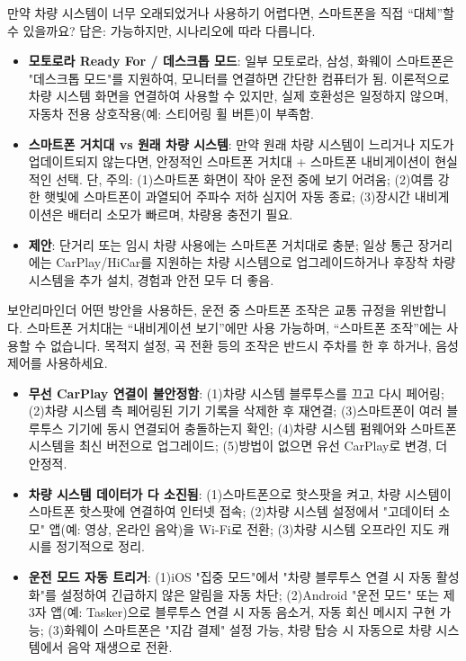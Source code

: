 
만약 차량 시스템이 너무 오래되었거나 사용하기 어렵다면, 스마트폰을 직접 “대체”할 수 있을까요? 답은: 가능하지만, 시나리오에 따라 다릅니다.

\begin{itemize}
  \item \textbf{모토로라 Ready For / 데스크톱 모드}: 일부 모토로라, 삼성, 화웨이 스마트폰은 "데스크톱 모드"를 지원하여, 모니터를 연결하면 간단한 컴퓨터가 됨. 이론적으로 차량 시스템 화면을 연결하여 사용할 수 있지만, 실제 호환성은 일정하지 않으며, 자동차 전용 상호작용(예: 스티어링 휠 버튼)이 부족함.
  \item \textbf{스마트폰 거치대 vs 원래 차량 시스템}: 만약 원래 차량 시스템이 느리거나 지도가 업데이트되지 않는다면, 안정적인 스마트폰 거치대 + 스마트폰 내비게이션이 현실적인 선택. 단, 주의: (1)스마트폰 화면이 작아 운전 중에 보기 어려움; (2)여름 강한 햇빛에 스마트폰이 과열되어 주파수 저하 심지어 자동 종료; (3)장시간 내비게이션은 배터리 소모가 빠르며, 차량용 충전기 필요.
  \item \textbf{제안}: 단거리 또는 임시 차량 사용에는 스마트폰 거치대로 충분; 일상 통근 장거리에는 CarPlay/HiCar를 지원하는 차량 시스템으로 업그레이드하거나 후장착 차량 시스템을 추가 설치, 경험과 안전 모두 더 좋음.
\end{itemize}

\begin{tcbwarn}{보안리마인더}
어떤 방안을 사용하든, 운전 중 스마트폰 조작은 교통 규정을 위반합니다. 스마트폰 거치대는 “내비게이션 보기”에만 사용 가능하며, “스마트폰 조작”에는 사용할 수 없습니다. 목적지 설정, 곡 전환 등의 조작은 반드시 주차를 한 후 하거나, 음성 제어를 사용하세요.

\end{tcbwarn}


\begin{itemize}
  \item \textbf{무선 CarPlay 연결이 불안정함}: (1)차량 시스템 블루투스를 끄고 다시 페어링; (2)차량 시스템 측 페어링된 기기 기록을 삭제한 후 재연결; (3)스마트폰이 여러 블루투스 기기에 동시 연결되어 충돌하는지 확인; (4)차량 시스템 펌웨어와 스마트폰 시스템을 최신 버전으로 업그레이드; (5)방법이 없으면 유선 CarPlay로 변경, 더 안정적.
  \item \textbf{차량 시스템 데이터가 다 소진됨}: (1)스마트폰으로 핫스팟을 켜고, 차량 시스템이 스마트폰 핫스팟에 연결하여 인터넷 접속; (2)차량 시스템 설정에서 "고데이터 소모" 앱(예: 영상, 온라인 음악)을 Wi-Fi로 전환; (3)차량 시스템 오프라인 지도 캐시를 정기적으로 정리.
  \item \textbf{운전 모드 자동 트리거}: (1)iOS "집중 모드"에서 "차량 블루투스 연결 시 자동 활성화"를 설정하여 긴급하지 않은 알림을 자동 차단; (2)Android "운전 모드" 또는 제3자 앱(예: Tasker)으로 블루투스 연결 시 자동 음소거, 자동 회신 메시지 구현 가능; (3)화웨이 스마트폰은 "지감 결제" 설정 가능, 차량 탑승 시 자동으로 차량 시스템에서 음악 재생으로 전환.
\end{itemize}

